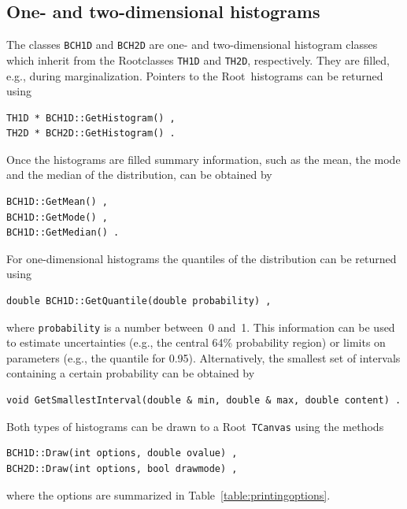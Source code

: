\documentclass[11pt, a4paper]{article}
\newcommand{\Root}{{\sc Root}}
\begin{document}

\subsection{One- and two-dimensional histograms}

The classes \verb|BCH1D| and \verb|BCH2D| are one- and two-dimensional
histogram classes which inherit from the \Root\-classes \verb|TH1D|
and \verb|TH2D|, respectively. They are filled, e.g., during
marginalization. Pointers to the \Root\ histograms can be returned
using
%
\begin{verbatim}
TH1D * BCH1D::GetHistogram() ,
TH2D * BCH2D::GetHistogram() .
\end{verbatim}
%
Once the histograms are filled summary information, such as the mean,
the mode and the median of the distribution, can be obtained by
%
\begin{verbatim}
BCH1D::GetMean() ,
BCH1D::GetMode() ,
BCH1D::GetMedian() .
\end{verbatim}
%
For one-dimensional histograms the quantiles of the distribution can
be returned using
%
\begin{verbatim}
double BCH1D::GetQuantile(double probability) ,
\end{verbatim}
%
where \verb|probability| is a number between~0 and~1. This information
can be used to estimate uncertainties (e.g., the central 64\%
probability region) or limits on parameters (e.g., the quantile for
0.95). Alternatively, the smallest set of intervals containing a
certain probability can be obtained by
%
\begin{verbatim}
void GetSmallestInterval(double & min, double & max, double content) .
\end{verbatim}

\noindent
Both types of histograms can be drawn to a \Root\ \verb|TCanvas| using
the methods
%
\begin{verbatim}
BCH1D::Draw(int options, double ovalue) ,
BCH2D::Draw(int options, bool drawmode) ,
\end{verbatim}
%
where the options are summarized in Table~\ref{table:printingoptions}.
\end{document}
